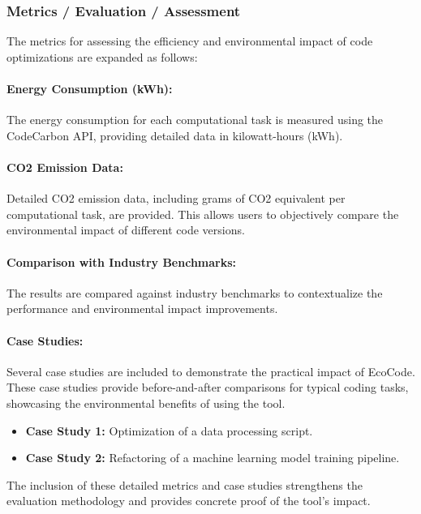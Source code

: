\documentclass[conference,compsoc]{IEEEtran}
\begin{document}
\subsubsection{Metrics / Evaluation / Assessment}
\label{sec:metrics_evaluation}

The metrics for assessing the efficiency and environmental impact of code optimizations are expanded as follows:

\paragraph{Energy Consumption (kWh):}
The energy consumption for each computational task is measured using the CodeCarbon API, providing detailed data in kilowatt-hours (kWh).

\paragraph{CO2 Emission Data:}
Detailed CO2 emission data, including grams of CO2 equivalent per computational task, are provided. This allows users to objectively compare the environmental impact of different code versions.

\paragraph{Comparison with Industry Benchmarks:}
The results are compared against industry benchmarks to contextualize the performance and environmental impact improvements.

\paragraph{Case Studies:}
Several case studies are included to demonstrate the practical impact of EcoCode. These case studies provide before-and-after comparisons for typical coding tasks, showcasing the environmental benefits of using the tool.

\begin{itemize}
  \item \textbf{Case Study 1:} Optimization of a data processing script.
  \item \textbf{Case Study 2:} Refactoring of a machine learning model training pipeline.
\end{itemize}

The inclusion of these detailed metrics and case studies strengthens the evaluation methodology and provides concrete proof of the tool's impact.
\end{document}

